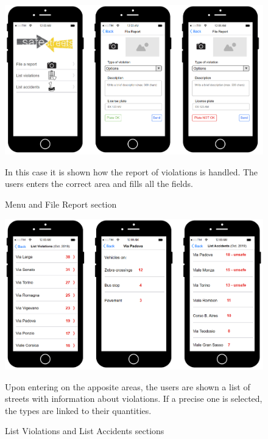 \begin{figure} [H]
    \includegraphics[scale=0.47]{Images/Templates/User/us_3.PNG}
    \caption{\label{fig:Mockup-2}Menu and File Report section}
    In this case it is shown how the report of violations is 
    handled. The users enters the correct area and fills all 
    the fields.
\end{figure}


\begin{figure} [H]
    \includegraphics[scale=0.5]{Images/Templates/User/us_4.PNG}
    \caption{\label{fig:Mockup-3}List Violations and List 
    Accidents sections}
    Upon entering on the apposite areas, the users are shown 
    a list of streets with information about violations. If 
    a precise one is selected, the types are linked to their 
    quantities.
\end{figure}


